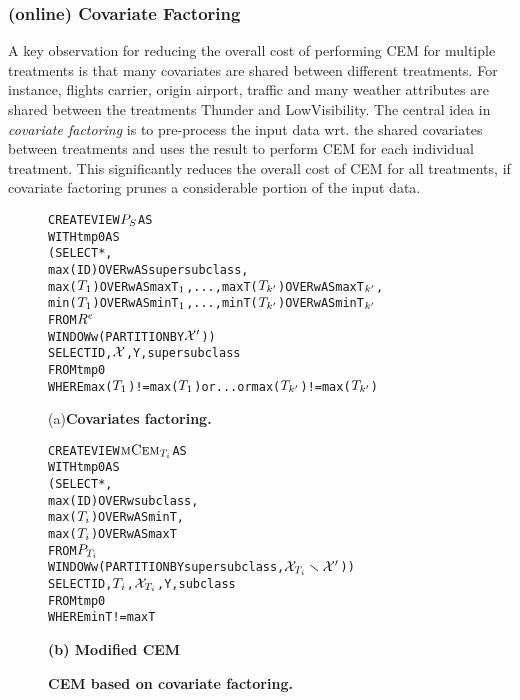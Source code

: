 \subsubsection{(online) Covariate Factoring}

A key observation for reducing the overall cost of performing CEM for multiple treatments is that
many covariates are shared between different treatments. For instance, flights carrier, origin airport, traffic and many weather attributes are shared between the treatments Thunder and LowVisibility. The central idea in {\em covariate factoring}  is to pre-process the input data
wrt.  the shared covariates between treatments and uses the result to perform CEM
for each individual treatment. This  significantly reduces the overall cost of CEM for all treatments,
if covariate factoring prunes a considerable portion of the input data.


\begin{figure}
\begin{alltt} 
CREATE VIEW \(\prp\) AS
WITH tmp0 AS
  (SELECT *,
          max(ID) OVER w AS supersubclass,
          max(\(T\sb1\)) OVER w AS maxT\(\sb1\),..., maxT(\(T\sb{k'}\)) OVER w AS maxT\(\sb{k'}\),
          min(\(T\sb1\)) OVER w AS minT\(\sb1\),..., minT(\(T\sb{k'}\)) OVER w AS minT\(\sb{k'}\)
   FROM \(\rele\)
   WINDOW w (PARTITION BY \(\ccvin\)))
SELECT ID, \(\ccvu\), Y , supersubclass
FROM tmp0
WHERE max(\(T\sb1\))!=max(\(T\sb{1}\)) or ... or  max(\(T\sb{k'}\))!=max(\(T\sb{k'}\))
\end{alltt}  \hspace{4.5cm}
(a)\bf{Covariates factoring.}
\vspace{-.1cm}
\begin{alltt} 
CREATE VIEW \(\mcem\) AS
WITH tmp0 AS
  (SELECT *,
          max(ID) OVER w    subclass,
          max(\(T\sb{i}\))  OVER w AS minT,
          max(\(T\sb{i}\))  OVER w AS maxT
   FROM \(\prpi\)
   WINDOW w (PARTITION BY supersubclass, \( \ccv\sb{T\sb{i}} \smallsetminus \ccvin  \)))
SELECT ID,\(T\sb{i}\),\(\ccv\sb{T\sb{i}}\), Y, subclass
FROM tmp0
WHERE minT!=maxT
\end{alltt}
 \hspace{5cm}
\bf{(b) Modified CEM}
\caption{\bf{CEM based on covariate factoring.}}\label{fig:cf}
\end{figure}






